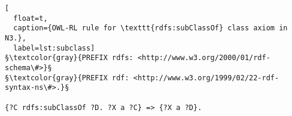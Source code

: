 %
% 
% 
% 
\begin{lstlisting}[
  float=t,
  caption={OWL-RL rule for \texttt{rdfs:subClassOf} class axiom in N3.},
  label=lst:subclass]
§\textcolor{gray}{PREFIX rdfs: <http://www.w3.org/2000/01/rdf-schema\#>}§
§\textcolor{gray}{PREFIX rdf: <http://www.w3.org/1999/02/22-rdf-syntax-ns\#>.}§

{?C rdfs:subClassOf ?D. ?X a ?C} => {?X a ?D}.
\end{lstlisting}
